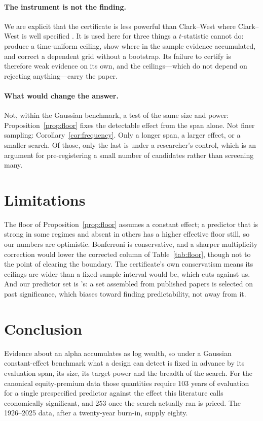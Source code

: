 \documentclass{article}
\theoremstyle{plain}
\theoremstyle{definition}
\begin{document}
\paragraph{The instrument is not the finding.} We are explicit that the certificate is less
powerful than Clark--West where Clark--West is well specified \citep{guven2026}. It is used
here for three things a $t$-statistic cannot do: produce a time-uniform ceiling, show where in
the sample evidence accumulated, and correct a dependent grid without a bootstrap. Its failure to certify is therefore weak evidence on its
own, and the ceilings---which do not depend on rejecting anything---carry the paper.

\paragraph{What would change the answer.} Not, within the Gaussian benchmark,
a test of the same size and power: Proposition~\ref{prop:floor} fixes the detectable effect
from the span alone. Not finer sampling:
Corollary~\ref{cor:frequency}. Only a longer span, a larger effect, or a smaller search. Of
those, only the last is under a researcher's control, which is an argument for pre-registering
a small number of candidates rather than screening many.

\section{Limitations}

The floor of Proposition~\ref{prop:floor} assumes a constant effect; a predictor that is
strong in some regimes and absent in others has a higher effective floor still, so our numbers
are optimistic. Bonferroni is conservative, and a sharper multiplicity correction would lower
the corrected column of Table~\ref{tab:floor}, though not to the point of clearing the
boundary. The certificate's own conservatism means its ceilings are wider than a
fixed-sample interval would be, which cuts against us. And our predictor set is
\citeauthor{goyal2024}'s: a set assembled from published papers is selected on past
significance, which biases toward finding predictability, not away from it.

\section{Conclusion}

Evidence about an alpha accumulates as log wealth, so under a Gaussian constant-effect
benchmark what a design can detect is fixed in advance by its evaluation span, its size, its
target power and the breadth of the search. For the canonical equity-premium data those
quantities require $103$ years of evaluation for a single prespecified predictor against the
effect this literature calls economically significant, and $253$ once the search
\citet{goyal2024} actually ran is priced. The 1926--2025 data, after a twenty-year burn-in,
supply eighty.
\end{document}
